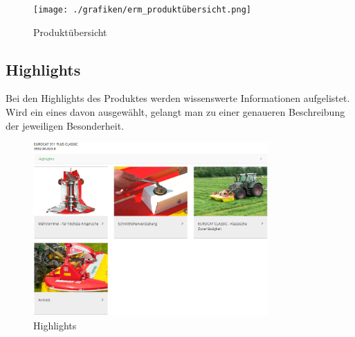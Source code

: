 \begin{figure}[H]
	\centerline{
		\texttt{[image: ./grafiken/erm\_produktübersicht.png]}
	}
	\vskip0pt
	\caption{Produktübersicht} \label{fig:produktübersicht}
\end{figure}

\subsection{Highlights}

Bei den Highlights des Produktes werden wissenswerte Informationen aufgelistet. Wird ein eines davon ausgewählt, gelangt man zu einer genaueren Beschreibung der jeweiligen Besonderheit.

\begin{figure}[H]
	\centerline{
		\includegraphics[width=0.8\textwidth]{./grafiken/erm_detailansicht_highlights.PNG}
	}
	\vskip0pt
	\caption{Highlights} \label{fig:highlight}
\end{figure}


